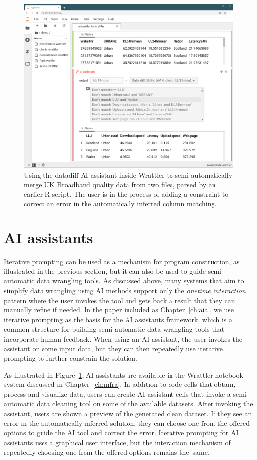 \documentclass[fleqn,11pt]{report}
\theoremstyle{definition}
\begin{document}
\begin{figure}[t]
\centering
\includegraphics[scale=0.24]{img/datadiff.png}
\caption{Using the datadiff AI assistant inside Wrattler to semi-automatically merge
UK Broadband quality data from two files, parsed by an earlier R script. The user is in the process
of adding a constraint to correct an error in the automatically inferred column matching.}
\label{fig:ddiff}
\end{figure}

\section{AI assistants}
Iterative prompting can be used as a mechanism for program construction, as illustrated in the
previous section, but it can also be used to guide semi-automatic data wrangling tools.
As discussed above, many systems that aim to simplify data wrangling using AI methods support
only the \emph{onetime interaction} pattern where the user invokes the tool and gets back a
result that they can manually refine if needed. In the paper included as Chapter~\ref{ch:aia},
we use iterative prompting as the basis for the AI assistants framework, which is a common
structure for building semi-automatic data wrangling tools that incorporate human feedback.
When using an AI assistant, the user invokes the assistant on some input data, but they can then
repeatedly use iterative prompting to further constrain the solution.

As illustrated in Figure~\ref{fig:ddiff}, AI assistants are available in the
Wrattler notebook system discussed in Chapter~\ref{ch:infra}. In addition to code cells that
obtain, process and visualize data, users can create AI assistant cells that invoke a semi-automatic
data cleaning tool on some of the available datasets. After invoking the assistant, users are
shown a preview of the generated clean dataset. If they see an error in the automatically inferred
solution, they can choose one from the offered options to guide the AI tool and correct the error.
Iterative prompting for AI assistants uses a graphical user interface, but the
interaction mechanism of repeatedly choosing one from the offered options remains the~same.
\end{document}
